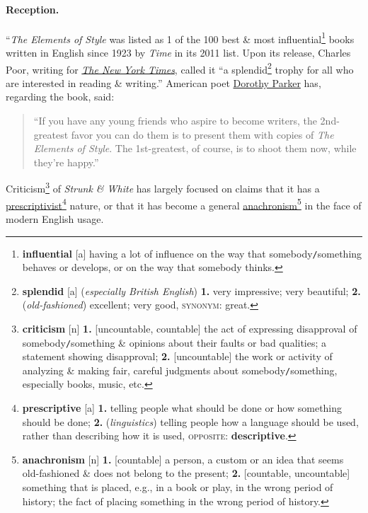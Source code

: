 \documentclass[oneside]{book}
\numberwithin{equation}{section}
\begin{document}
\paragraph*{Reception.} ``\textit{The Elements of Style} was listed as 1 of the 100 best \& most influential\footnote{\textbf{influential} [a] having a lot of influence on the way that somebody\texttt{/}something behaves or develops, or on the way that somebody thinks.} books written in English since 1923 by \textit{Time} in its 2011 list. Upon its release, Charles Poor, writing for \href{https://en.wikipedia.org/wiki/The_New_York_Times}{\textit{The New York Times}}, called it ``a splendid\footnote{\textbf{splendid} [a] (\textit{especially British English}) \textbf{1.} very impressive; very beautiful; \textbf{2.} (\textit{old-fashioned}) excellent; very good, \textsc{synonym}: great.} trophy for all who are interested in reading \& writing.'' American poet \href{https://en.wikipedia.org/wiki/Dorothy_Parker}{Dorothy Parker} has, regarding the book, said:
\begin{quotation}
	``If you have any young friends who aspire to become writers, the 2nd-greatest favor you can do them is to present them with copies of \textit{The Elements of Style}. The 1st-greatest, of course, is to shoot them now, while they're happy.''
\end{quotation}
Criticism\footnote{\textbf{criticism} [n] \textbf{1.} [uncountable, countable] the act of expressing disapproval of somebody\texttt{/}something \& opinions about their faults or bad qualities; a statement showing disapproval; \textbf{2.} [uncountable] the work or activity of analyzing \& making fair, careful judgments about somebody\texttt{/}something, especially books, music, etc.} of \textit{Strunk \& White} has largely focused on claims that it has a \href{https://en.wikipedia.org/wiki/Linguistic_prescriptivism}{prescriptivist}\footnote{\textbf{prescriptive} [a] \textbf{1.} telling people what should be done or how something should be done; \textbf{2.} (\textit{linguistics}) telling people how a language should be used, rather than describing how it is used, \textsc{opposite}: \textbf{descriptive}.} nature, or that it has become a general \href{https://en.wikipedia.org/wiki/Anachronism}{anachronism}\footnote{\textbf{anachronism} [n] \textbf{1.} [countable] a person, a custom or an idea that seems old-fashioned \& does not belong to the present; \textbf{2.} [countable, uncountable] something that is placed, e.g., in a book or play, in the wrong period of history; the fact of placing something in the wrong period of history.} in the face of modern English usage.
\end{document}
